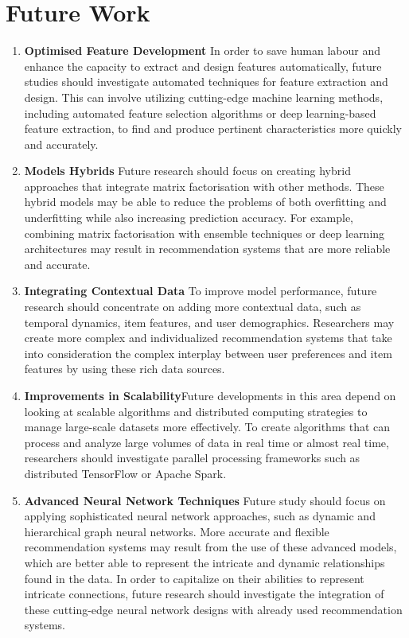 \documentclass[9pt,twocolumn,twoside,lineno]{gsajnl}
\begin{document}
\section{Future Work}
\begin{enumerate}
    \item \textbf{Optimised Feature Development\newline} In order to save human labour and enhance the capacity to extract and design features automatically, future studies should investigate automated techniques for feature extraction and design. This can involve utilizing cutting-edge machine learning methods, including automated feature selection algorithms or deep learning-based feature extraction, to find and produce pertinent characteristics more quickly and accurately.
    \item \textbf{Models Hybrids\newline} Future research should focus on creating hybrid approaches that integrate matrix factorisation with other methods. These hybrid models may be able to reduce the problems of both overfitting and underfitting while also increasing prediction accuracy. For example, combining matrix factorisation with ensemble techniques or deep learning architectures may result in recommendation systems that are more reliable and accurate.
    \item \textbf{Integrating Contextual Data\newline} To improve model performance, future research should concentrate on adding more contextual data, such as temporal dynamics, item features, and user demographics. Researchers may create more complex and individualized recommendation systems that take into consideration the complex interplay between user preferences and item features by using these rich data sources.
    \item \textbf{Improvements in Scalability\newline}Future developments in this area depend on looking at scalable algorithms and distributed computing strategies to manage large-scale datasets more effectively. To create algorithms that can process and analyze large volumes of data in real time or almost real time, researchers should investigate parallel processing frameworks such as distributed TensorFlow or Apache Spark.
    \item \textbf{Advanced Neural Network Techniques \Newline} Future study should focus on applying sophisticated neural network approaches, such as dynamic and hierarchical graph neural networks. More accurate and flexible recommendation systems may result from the use of these advanced models, which are better able to represent the intricate and dynamic relationships found in the data. In order to capitalize on their abilities to represent intricate connections, future research should investigate the integration of these cutting-edge neural network designs with already used recommendation systems.
\end{enumerate}
\end{document}
